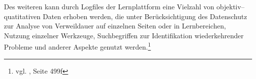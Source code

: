 Des weiteren kann durch Logfiles der Lernplattform eine Vielzahl von objektiv–quatitativen Daten erhoben werden, die unter Berücksichtigung des Datenschutz zur Analyse von Verweildauer auf einzelnen Seiten oder in Lernbereichen, Nutzung einzelner Werkzeuge, Suchbegriffen zur Identifikation wiederkehrender Probleme und anderer Aspekte genutzt werden.\footnote{vgl. \cite{euler}, Seite 499f}

